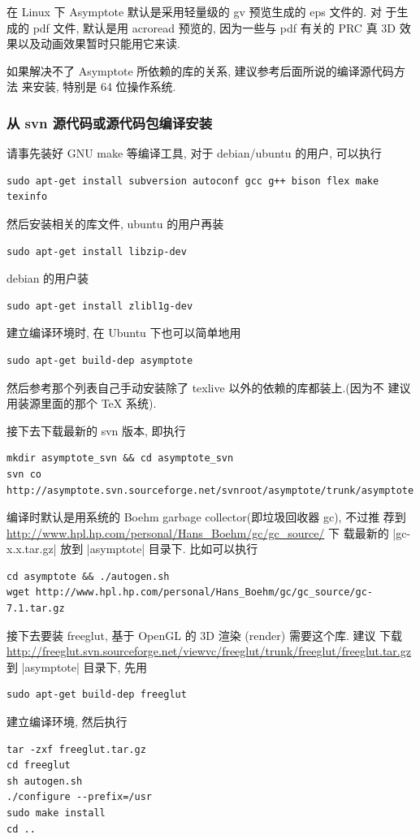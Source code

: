 \documentclass[nofonts,CJKnormalspaces]{ctexbook}
\begin{document}
在 Linux 下 Asymptote 默认是采用轻量级的 gv 预览生成的 eps 文件的. 对
于生成的 pdf 文件, 默认是用 acroread 预览的, 因为一些与 pdf 有关的 PRC
真 3D 效果以及动画效果暂时只能用它来读.

如果解决不了 Asymptote 所依赖的库的关系, 建议参考后面所说的编译源代码方法
来安装, 特别是 64 位操作系统.

\subsubsection{从 svn 源代码或源代码包编译安装}
请事先装好 GNU make 等编译工具, 对于 debian/ubuntu 的用户, 可以执行
\begin{verbatim}
sudo apt-get install subversion autoconf gcc g++ bison flex make texinfo
\end{verbatim}
然后安装相关的库文件, ubuntu 的用户再装
\begin{verbatim}
sudo apt-get install libzip-dev
\end{verbatim}
debian 的用户装
\begin{verbatim}
sudo apt-get install zlibl1g-dev
\end{verbatim}

建立编译环境时, 在 Ubuntu 下也可以简单地用
\begin{verbatim}
sudo apt-get build-dep asymptote
\end{verbatim}
然后参考那个列表自己手动安装除了 texlive 以外的依赖的库都装上.(因为不
建议用装源里面的那个 TeX 系统).

接下去下载最新的 svn 版本, 即执行
\begin{verbatim}
mkdir asymptote_svn && cd asymptote_svn
svn co http://asymptote.svn.sourceforge.net/svnroot/asymptote/trunk/asymptote
\end{verbatim}
编译时默认是用系统的 Boehm garbage collector(即垃圾回收器 gc), 不过推
荐到 \url{http://www.hpl.hp.com/personal/Hans_Boehm/gc/gc_source/} 下
载最新的 |gc-x.x.tar.gz| 放到 |asymptote| 目录下.
比如可以执行
\begin{verbatim}
cd asymptote && ./autogen.sh
wget http://www.hpl.hp.com/personal/Hans_Boehm/gc/gc_source/gc-7.1.tar.gz
\end{verbatim}

接下去要装 freeglut, 基于 OpenGL 的 3D 渲染 (render) 需要这个库. 建议
下载
\url{http://freeglut.svn.sourceforge.net/viewvc/freeglut/trunk/freeglut/freeglut.tar.gz}
到 |asymptote| 目录下, 先用
\begin{verbatim}
sudo apt-get build-dep freeglut
\end{verbatim}
建立编译环境, 然后执行
\begin{verbatim}
tar -zxf freeglut.tar.gz
cd freeglut
sh autogen.sh
./configure --prefix=/usr
sudo make install
cd ..
\end{verbatim}
\end{document}
